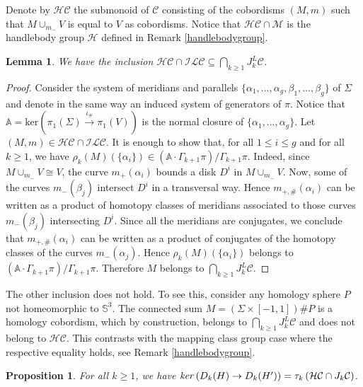 \documentclass[10pt]{amsart}
\numberwithin{equation}{section}
\numberwithin{equation}{section}
\newtheorem{proposition}[theorem]{Proposition}
\newtheorem{lemma}[theorem]{Lemma}
\theoremstyle{definition}
\begin{document}
 Denote by $\mathcal{HC}$ the submonoid of $\mathcal{C}$ consisting of the cobordisms  $(M,m)$ such that $M\cup_{m_-}V$ is equal to $V$ as cobordisms. Notice that $\mathcal{HC}\cap \mathcal{M}$ is the handlebody group $\mathcal{H}$ defined in Remark \ref{handlebodygroup}.


\begin{lemma}\label{lemma4.10} We have the inclusion $\mathcal{HC}\cap \mathcal{ILC}\subseteq \bigcap_{k\geq1} J_k^L\mathcal{C}$.
\end{lemma}
\begin{proof}
Consider the system of meridians and parallels  $\{\alpha_1,\ldots,\alpha_g,\beta_1,\ldots,\beta_g\}$ of $\Sigma$ and denote in the same way an induced system of generators of $\pi$. Notice that $\mathbb{A}=\text{ker}(\pi_1(\Sigma)\stackrel{\iota_{\#}}{\longrightarrow}\pi_1(V))$ is the normal closure  of $\{\alpha_1,\ldots,\alpha_g\}$. Let $(M,m)\in\mathcal{HC}\cap\mathcal{ILC}$. It is enough to show that, for all $1\leq i\leq g$ and for all $k\geq 1$, we have $\rho_k(M)(\{\alpha_i\})\in (\mathbb{A}\cdot\Gamma_{k+1}\pi)/\Gamma_{k+1}\pi$. Indeed, since $M\cup_{m_-}V\cong V$, the curve $m_+(\alpha_i)$ bounds a disk $D^i$ in $M\cup_{m_-}V$. Now, some of the curves $m_-(\beta_j)$ intersect $D^i$ in a transversal way. Hence $m_{+,\#}(\alpha_i)$ can be written as a product of homotopy classes of  meridians associated to those curves $m_-(\beta_j)$ intersecting $D^i$. Since all the meridians are conjugates, we conclude that $m_{+,\#}(\alpha_i)$ can be written  as a product of conjugates of the homotopy classes of  the curves  $m_{-}(\alpha_j)$.  Hence $\rho_k(M)(\{\alpha_i\})$ belongs to $(\mathbb{A}\cdot\Gamma_{k+1}\pi)/\Gamma_{k+1}\pi$. Therefore $M$ belongs to  $\bigcap_{k\geq1} J_k^L\mathcal{C}$.
\end{proof}

The other inclusion does not hold. To see this, consider any homology sphere $P$ not homeomorphic to $\mathbb{S}^3$.   The connected sum  $M=(\Sigma\times [-1,1])\# P$ is a homology cobordism, which by  construction, belongs to $\bigcap_{k\geq1} J_k^L\mathcal{C}$ and does not belong to $\mathcal{HC}$. This contrasts with the mapping class group case where the respective equality holds, see Remark \ref{handlebodygroup}. 



\begin{proposition}\label{propdif} For all $k\geq 1$, we have $\text{\emph{ker}}\left(D_k(H)\rightarrow D_k(H')\right)=\tau_k\left(\mathcal{HC}\cap J_k\mathcal{C}\right)$.
\end{proposition}
\end{document}
